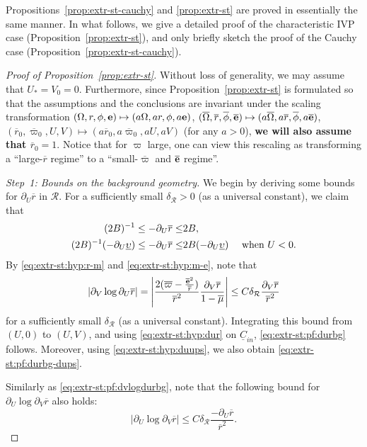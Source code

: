\documentclass[10pt, reqno]{amsart}
\theoremstyle{definition}
\theoremstyle{remark}
\theoremstyle{conjecture}
\numberwithin{equation}{section}
\newcommand{\abs}[1]{\vert#1\vert}
\newcommand{\rd}{\partial}
\newcommand{\0}{\emptyset}
\newcommand{\dlt}{\delta}
\newcommand{\Omg}{\Omega}
\newcommand{\ups}{\upsilon}
\newcommand{\bfe}{{\bf e}}
\newcommand{\calR}{\mathcal R}
\newcommand{\uC}{\underline{C}}
\newcommand{\pfstep}[1]{\vspace{.5em} {\it \noindent #1.}}
\newcommand{\e}{\bfe}							%
\newcommand{\Omgbg}{\overline{\Omg}}				%
\newcommand{\phibg}{\overline{\phi}}				%
\newcommand{\rbg}{\overline{r}}					%
\newcommand{\varpibg}{\overline{\varpi}}				%
\newcommand{\mubg}{\overline{\mu}}				%
\newcommand{\ebg}{\overline{\e}}					%
\newcommand{\Abs}[1]{\left\vert #1 \right\vert}
\begin{document}
Propositions~\ref{prop:extr-st-cauchy} and \ref{prop:extr-st} are proved in essentially the same manner. In what follows, we give a detailed proof of the characteristic IVP case (Proposition~\ref{prop:extr-st}), and only briefly sketch the proof of the Cauchy case (Proposition~\ref{prop:extr-st-cauchy}).

\begin{proof}[Proof of Proposition~\ref{prop:extr-st}]
Without loss of generality, we may assume that $U_{\ast} = V_{0} = 0$. Furthermore, since Proposition~\ref{prop:extr-st} is formulated so that the assumptions and the conclusions are invariant under the scaling transformation $(\Omg, r, \phi, \e) \mapsto (a \Omg, a r, \phi, a \e)$, $(\Omgbg, \rbg, \phibg, \ebg) \mapsto (a \Omgbg, a \rbg, \phibg, a \ebg)$, $(\rbg_{0}, \varpibg_{0}, U, V) \mapsto (a \rbg_{0}, a \varpibg_{0}, aU, aV)$ (for any $a > 0$), \textbf{we will also assume that $\rbg_{0} = 1$}. Notice that for $\varpi$ large, one can view this rescaling as transforming a ``large-$\rbg$ regime'' to a ``small-$\varpibg$ and $\ebg$ regime''.

\pfstep{Step~1: Bounds on the background geometry}
We begin by deriving some bounds for $\rd_{U} \rbg$ in $\calR$. For a sufficiently small $\dlt_{\calR} > 0$ (as a universal constant), we claim that
\begin{align} 
	(2B)^{-1} \leq - \rd_{U} \rbg \leq & 2 B,	\label{eq:extr-st:pf:durbg}  \\
	(2B )^{-1} (-\rd_{U} \underline{\ups}) \leq - \rd_{U} \rbg \leq & 2 B (-\rd_{U} \underline{\ups}) \quad \hbox{ when } U < 0.	\label{eq:extr-st:pf:durbg-dups}  
\end{align}
By \eqref{eq:extr-st:hyp:r-m} and \eqref{eq:extr-st:hyp:m-e}, note that
\begin{align}
	\abs{\rd_{V} \log \rd_{U} \rbg }
	= \Abs{\frac{2 (\varpibg - \frac{\ebg^{2}}{\rbg})}{\rbg^{2}} \frac{\rd_{V} \rbg}{1-\mubg}}
	\leq C \dlt_{\calR} \frac{\rd_{V} \rbg}{\rbg^{2}} \label{eq:extr-st:pf:dvlogdurbg}
\end{align}
for a sufficiently small $\dlt_{\calR}$ (as a universal constant). Integrating this bound from $(U, 0)$ to $(U, V)$, and using \eqref{eq:extr-st:hyp:dur} on $\uC_{in}$, \eqref{eq:extr-st:pf:durbg} follows. Moreover, using \eqref{eq:extr-st:hyp:duups}, we also obtain \eqref{eq:extr-st:pf:durbg-dups}.

Similarly as \eqref{eq:extr-st:pf:dvlogdurbg}, note that the following bound for $\rd_{U} \log \rd_{V} \rbg$ also holds:
\begin{equation} \label{eq:extr-st:pf:dulogdvrbg}
	\abs{\rd_{U} \log \rd_{V} \rbg }
	\leq C \dlt_{\calR} \frac{- \rd_{U} \rbg}{\rbg^{2}}.
\end{equation}



\end{proof}
\end{document}
